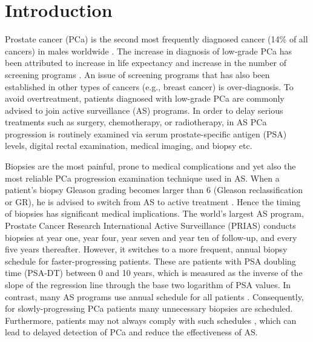 \section{Introduction}
\label{sec : introduction}
Prostate cancer (PCa) is the second most frequently diagnosed cancer (14\% of all cancers) in males worldwide \citep{GlobalCancerStats2012}. The increase in diagnosis of low-grade PCa has been attributed to increase in life expectancy and increase in the number of screening programs \citep{potoskyPSAcancer}. An issue of screening programs that has also been established in other types of cancers (e.g., breast cancer) is over-diagnosis.  To avoid overtreatment, patients diagnosed with low-grade PCa are commonly advised to join active surveillance (AS) programs. In order to delay serious treatments such as surgery, chemotherapy, or radiotherapy, in AS PCa progression is routinely examined via serum prostate-specific antigen (PSA) levels, digital rectal examination, medical imaging, and biopsy etc.

Biopsies are the most painful, prone to medical complications \citep{loeb2013systematic} and yet also the most reliable PCa progression examination technique used in AS. When a patient's biopsy Gleason grading becomes larger than 6 (Gleason reclassification or GR), he is advised to switch from AS to active treatment \citep{bokhorst2015compliance}. Hence the timing of biopsies has significant medical implications. The world's largest AS program, Prostate Cancer Research International Active Surveillance (PRIAS) conducts biopsies at year one, year four, year seven and year ten of follow-up, and every five years thereafter. However, it switches to a more frequent, annual biopsy schedule for faster-progressing patients. These are patients with PSA doubling time (PSA-DT) between 0 and 10 years, which is measured as the inverse of the slope of the regression line through the base two logarithm of PSA values. In contrast, many AS programs use annual schedule for all patients \citep{tosoian2011active,welty2015extended}. Consequently, for slowly-progressing PCa patients many unnecessary biopsies are scheduled. Furthermore, patients may not always comply with such schedules \citep{bokhorst2015compliance}, which can lead to delayed detection of PCa and reduce the effectiveness of AS.

